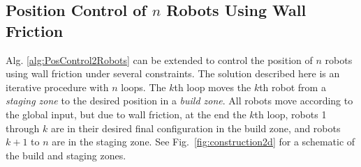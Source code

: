 





\subsection{Position Control of $n$ Robots Using Wall Friction}\label{sec:PostionControlnRobots}
Alg. \ref{alg:PosControl2Robots}  can be extended to control the position of $n$ robots using wall friction under several constraints. The solution described here is an iterative procedure with $n$ loops. The $k$th loop moves the $k$th robot from a \emph{staging zone} to the desired position in a \emph{build zone}. All robots move according to the global input, but due to wall friction, at the end the $k$th loop, robots 1 through $k$ are in their desired final configuration in the build zone, and robots $k+1$ to $n$ are in the staging zone. See Fig.~\ref{fig:construction2d} for a schematic of the build and staging zones.


